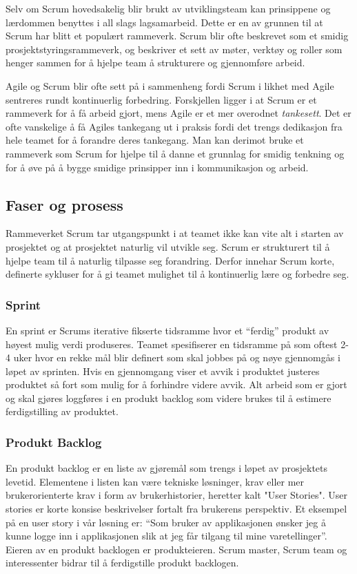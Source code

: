 Selv om Scrum hovedsakelig blir brukt av utviklingsteam kan prinsippene og lærdommen benyttes i all slags lagsamarbeid. Dette er en av grunnen til at Scrum har blitt et populært rammeverk. Scrum blir ofte beskrevet som et smidig prosjektstyringsrammeverk, og beskriver et sett av møter, verktøy og roller som henger sammen for å hjelpe team å strukturere og gjennomføre arbeid.

Agile og Scrum blir ofte sett på i sammenheng fordi Scrum i likhet med Agile sentreres rundt kontinuerlig forbedring. Forskjellen ligger i at Scrum er et rammeverk for å få arbeid gjort, mens Agile er et mer overodnet \textit{tankesett}. Det er ofte vanskelige å få Agiles tankegang ut i praksis fordi det trengs dedikasjon fra hele teamet for å forandre deres tankegang. Man kan derimot bruke et rammeverk som Scrum for hjelpe til å danne et grunnlag for smidig tenkning og for å øve på å bygge smidige prinsipper inn i kommunikasjon og arbeid.

\subsection{\textbf{Faser og prosess}}
Rammeverket Scrum tar utgangspunkt i at teamet ikke kan vite alt i starten av prosjektet og at prosjektet naturlig vil utvikle seg. Scrum er strukturert til å hjelpe team til å naturlig tilpasse seg forandring. Derfor innehar Scrum korte, definerte sykluser for å gi teamet mulighet til å kontinuerlig lære og forbedre seg.

\subsubsection{\textbf{Sprint}}
En sprint er Scrums iterative fikserte tidsramme hvor et “ferdig” produkt av høyest mulig verdi produseres. Teamet spesifiserer en tidsramme på som oftest 2-4 uker hvor en rekke mål blir definert som skal jobbes på og nøye gjennomgås i løpet av sprinten. Hvis en gjennomgang viser et avvik i produktet justeres produktet så fort som mulig for å forhindre videre avvik. Alt arbeid som er gjort og skal gjøres loggføres i en produkt backlog som videre brukes til å estimere ferdigstilling av produktet.

\subsubsection{\textbf{Produkt Backlog}}
En produkt backlog er en liste av gjøremål som trengs i løpet av prosjektets levetid. Elementene i listen kan være tekniske løsninger, krav eller mer brukerorienterte krav i form av brukerhistorier, heretter kalt "User Stories". User stories er korte konsise beskrivelser fortalt fra brukerens perspektiv. Et eksempel på en user story i vår løsning er: “Som bruker av applikasjonen ønsker jeg å kunne logge inn i applikasjonen slik at jeg får tilgang til mine varetellinger”. Eieren av en produkt backlogen er produkteieren. Scrum master, Scrum team og interessenter bidrar til å ferdigstille produkt backlogen. 

